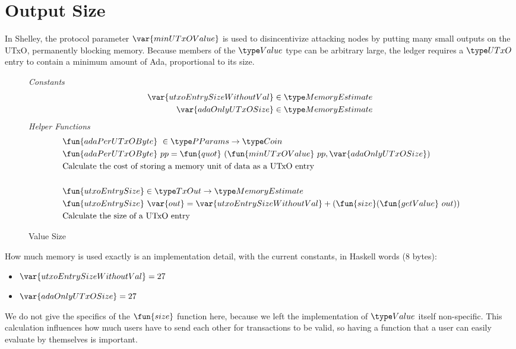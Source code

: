 \section{Output Size}
\label{sec:value-size}

In Shelley, the protocol parameter $\var{minUTxOValue}$ is used to
disincentivize attacking nodes by putting many small outputs on the
UTxO, permanently blocking memory. Because members of the $\Value$
type can be arbitrary large, the ledger requires a $\UTxO$ entry to
contain a minimum amount of Ada, proportional to its size.

\begin{figure*}[h]
  \emph{Constants}
  \begin{align*}
  \var{utxoEntrySizeWithoutVal} \in \MemoryEstimate \\
  \var{adaOnlyUTxOSize} \in \MemoryEstimate
  \end{align*}
  \emph{Helper Functions}
  \begin{align*}
    & \fun{adaPerUTxOByte}~\in \PParams \to \Coin \\
    & \fun{adaPerUTxOByte}~pp = \fun{quot}~ (\fun{minUTxOValue}~pp, \var{adaOnlyUTxOSize}) \\
    & \text{Calculate the cost of storing a memory unit of data as a UTxO entry} \\~\\
    & \fun{utxoEntrySize} \in \TxOut \to \MemoryEstimate \\
    & \fun{utxoEntrySize}~\var{out} = \var{utxoEntrySizeWithoutVal} + (\fun{size} (\fun{getValue}~out)) \\
    & \text{Calculate the size of a UTxO entry}
  \end{align*}
  \caption{Value Size}
  \label{fig:test}
\end{figure*}

How much memory is used exactly is an implementation detail, with the current constants, in Haskell words (8 bytes):
\begin{itemize}
  \item $\var{utxoEntrySizeWithoutVal} = 27$
  \item $\var{adaOnlyUTxOSize} = 27$
\end{itemize}

We do not give the specifics of the $\fun{size}$ function here, because
we left the implementation of $\Value$ itself non-specific. This calculation
influences how much users have to send each
other for transactions to be valid, so having a function that a user
can easily evaluate by themselves is important.
